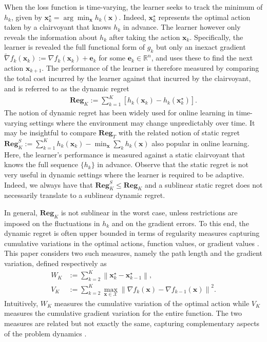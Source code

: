 \documentclass[draftcls,onecolumn,12pt]{IEEEtran}
\theoremstyle{plain}
\def\x{\mathbf{x}}
\def\e{\mathbf{e}}
\def\cX {\mathcal{X}}
\def\Rn{\mathbb{R}}
\def\xks{\x_k^\star}
\def \nt {\tilde{\nabla}}
\providecommand{\norm}[1]{\left\|#1\right\|}
\theoremstyle{plain}
\theoremstyle{remark}
\begin{document}
When the loss function is time-varying, the learner seeks to track the minimum of $h_k$, given by $\xks = \arg\min_{\x} h_k(\x)$. Indeed, $\xks$ represents the optimal action taken by a clairvoyant that knows $h_k$ in advance. The learner however only reveals the information about  $h_k$ after taking the action $\x_k$. Specifically, the learner is revealed the full functional form of $g_k$ but only an inexact gradient $\nt f_k(\x_k):=\nabla f_k(\x_k) + \e_k$ for some $\e_k\in \Rn^n$, and uses these to find the next action $\x_{k+1}$. The performance of the learner is therefore measured by comparing the total cost incurred by the learner against that incurred by the clairvoyant, and is referred to as the dynamic regret \cite{mokhtari2016online,besbes2015non,hall2015online}
\begin{align}\label{regret}
\mathbf{Reg}_K:=\sum\limits_{k=1}^{K}[h_k(\x_k)-h_k(\xks)].
\end{align}
The notion of dynamic regret has been widely used for online learning in time-varying settings where the environment may change unpredictably over time. It may be insightful to compare $\textbf{Reg}_T$ with the related notion of static regret $\mathbf{Reg}_K^S:=\sum_{k=1}^{K}h_k(\x_k)-\min_\x\sum_k h_k(\x)$ also popular in online learning. Here, the learner's performance is measured against a static clairvoyant that knows the full sequence $\{h_k\}$ in advance. Observe that the static regret is not very useful in dynamic settings where the learner is required to be adaptive. Indeed, we always have that  $\mathbf{Reg}_K^S\leq \mathbf{Reg}_K$ and a sublinear static regret does not necessarily translate to a sublinear dynamic regret. 

In general, $\mathbf{Reg}_K$ is not sublinear in the worst case, unless restrictions are imposed on the fluctuations in $h_k$ \cite{besbes2015non} and on the gradient errors. To this end, the dynamic regret is often upper bounded in terms of regularity measures capturing cumulative variations in the optimal actions, function values, or gradient values \cite{mokhtari2016online,shahrampour2016distributed,shahrampour2018distributed}. This paper considers two such measures, namely the path length and the gradient variation, defined respectively as
\begin{align}\label{eq:var_optimal_points}
W_K&:=\sum\limits_{k=2}^{K}\norm{\xks-\x_{k-1}^\star}, \\
V_K&:=\sum\limits_{k=2}^{K}\max_{\x \in \cX}\norm{\nabla f_k(\x)-\nabla f_{k-1}(\x)}^2. \label{vkdef}
\end{align}
Intuitively, $W_K$ measures the cumulative variation of the optimal action while $V_K$ measures the cumulative gradient variation for the entire function. The two measures are related but not exactly the same, capturing complementary aspects of the problem dynamics \cite{besbes2015non,mokhtari2016online}. 
\end{document}
